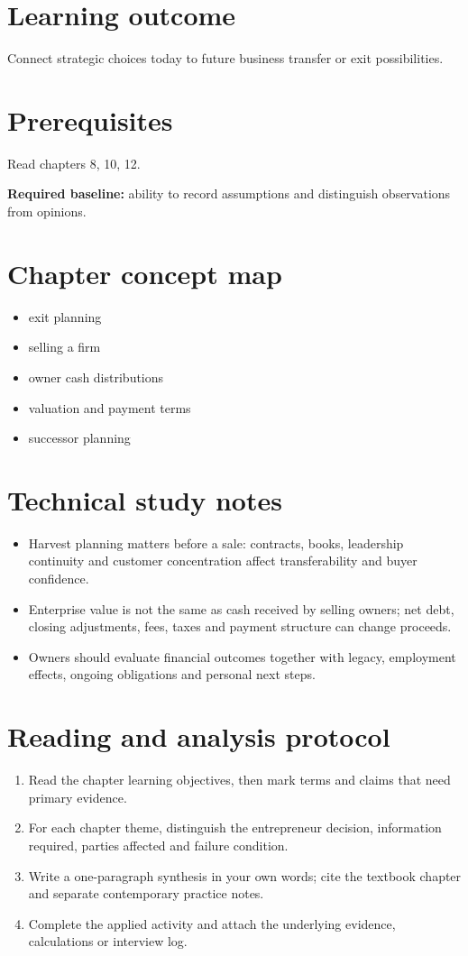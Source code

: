 \documentclass[11pt,letterpaper]{article}
\begin{document}
\SuiteOpen
\section{Learning outcome}
Connect strategic choices today to future business transfer or exit possibilities.
\section{Prerequisites}
Read chapters 8, 10, 12.\par\textbf{Required baseline:} ability to record assumptions and distinguish observations from opinions.
\section{Chapter concept map}
\begin{itemize}[leftmargin=*,itemsep=3pt]
\item exit planning
\item selling a firm
\item owner cash distributions
\item valuation and payment terms
\item successor planning
\end{itemize}

\section{Technical study notes}
\begin{itemize}[leftmargin=*,itemsep=3pt]
\item Harvest planning matters before a sale: contracts, books, leadership continuity and customer concentration affect transferability and buyer confidence.
\item Enterprise value is not the same as cash received by selling owners; net debt, closing adjustments, fees, taxes and payment structure can change proceeds.
\item Owners should evaluate financial outcomes together with legacy, employment effects, ongoing obligations and personal next steps.
\end{itemize}

\section{Reading and analysis protocol}
\begin{enumerate}[leftmargin=*,itemsep=5pt]
\item Read the chapter learning objectives, then mark terms and claims that need primary evidence.
\item For each chapter theme, distinguish the entrepreneur decision, information required, parties affected and failure condition.
\item Write a one-paragraph synthesis in your own words; cite the textbook chapter and separate contemporary practice notes.
\item Complete the applied activity and attach the underlying evidence, calculations or interview log.
\end{enumerate}
\end{document}
